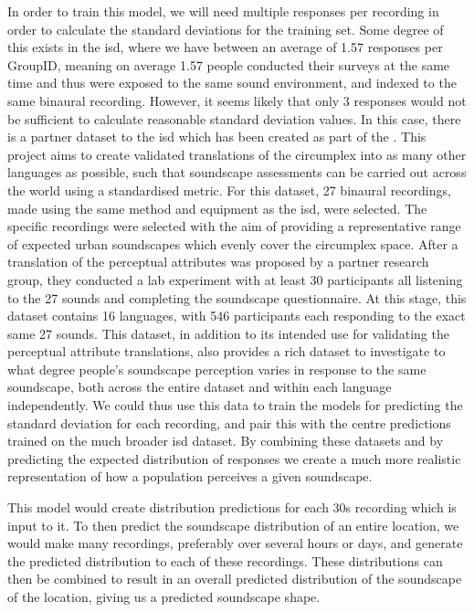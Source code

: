 In order to train this model, we will need multiple responses per recording in order to calculate the standard deviations for the training set. Some degree of this exists in the \gls{isd}, where we have between an average of 1.57 responses per GroupID, meaning on average 1.57 people conducted their surveys at the same time and thus were exposed to the same sound environment, and indexed to the same binaural recording. However, it seems likely that only 3 responses would not be sufficient to calculate reasonable standard deviation values. In this case, there is a partner dataset to the \gls{isd} which has been created as part of the  \citep{Aletta2020Soundscape}. This project aims to create validated translations of the circumplex  into as many other languages as possible, such that soundscape assessments can be carried out across the world using a standardised metric. For this dataset, 27 binaural recordings, made using the same method and equipment as the \gls{isd}, were selected. The specific recordings were selected with the aim of providing a representative range of expected urban soundscapes which evenly cover the circumplex space. After a translation of the perceptual attributes was proposed by a partner research group, they conducted a lab experiment with at least 30 participants all listening to the 27 sounds and completing the soundscape questionnaire. At this stage, this dataset contains 16 languages, with 546 participants each responding to the exact same 27 sounds. This dataset, in addition to its intended use for validating the perceptual attribute translations, also provides a rich dataset to investigate to what degree people's soundscape perception varies in response to the same soundscape, both across the entire dataset and within each language independently. We could thus use this data to train the models for predicting the standard deviation for each recording, and pair this with the centre predictions trained on the much broader \gls{isd} dataset. By combining these datasets and by predicting the expected distribution of responses we create a much more realistic representation of how a population perceives a given soundscape. 

This model would create distribution predictions for each 30s recording which is input to it. To then predict the soundscape distribution of an entire location, we would make many recordings, preferably over several hours or days, and generate the predicted distribution to each of these recordings. These distributions can then be combined to result in an overall predicted distribution of the soundscape of the location, giving us a predicted soundscape shape.

